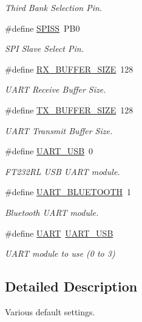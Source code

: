 \begin{DoxyCompactItemize}
\begin{DoxyCompactList}\small\item\em Third Bank Selection Pin. \end{DoxyCompactList}\item 
\#define \hyperlink{group__config_gab652052c0495e4b720b52cdcf83f535d}{S\-P\-I\-S\-S}~P\-B0
\begin{DoxyCompactList}\small\item\em S\-P\-I Slave Select Pin. \end{DoxyCompactList}\item 
\#define \hyperlink{group__config_ga739a2a1a0047c98ac1b18ecd25dac092}{R\-X\-\_\-\-B\-U\-F\-F\-E\-R\-\_\-\-S\-I\-Z\-E}~128
\begin{DoxyCompactList}\small\item\em U\-A\-R\-T Receive Buffer Size. \end{DoxyCompactList}\item 
\#define \hyperlink{group__config_ga9ab33647617098646990fe263600b650}{T\-X\-\_\-\-B\-U\-F\-F\-E\-R\-\_\-\-S\-I\-Z\-E}~128
\begin{DoxyCompactList}\small\item\em U\-A\-R\-T Transmit Buffer Size. \end{DoxyCompactList}\item 
\#define \hyperlink{group__config_ga9757131cd175465e6220de58b57f6b78}{U\-A\-R\-T\-\_\-\-U\-S\-B}~0
\begin{DoxyCompactList}\small\item\em F\-T232\-R\-L U\-S\-B U\-A\-R\-T module. \end{DoxyCompactList}\item 
\#define \hyperlink{group__config_ga2c948aa36e7c71b5e04623c1f560f1f1}{U\-A\-R\-T\-\_\-\-B\-L\-U\-E\-T\-O\-O\-T\-H}~1
\begin{DoxyCompactList}\small\item\em Bluetooth U\-A\-R\-T module. \end{DoxyCompactList}\item 
\#define \hyperlink{group__config_gaf7cb12b462b4594bd759d1b4e241ec4c}{U\-A\-R\-T}~\hyperlink{group__config_ga9757131cd175465e6220de58b57f6b78}{U\-A\-R\-T\-\_\-\-U\-S\-B}
\begin{DoxyCompactList}\small\item\em U\-A\-R\-T module to use (0 to 3) \end{DoxyCompactList}\end{DoxyCompactItemize}


\subsection{Detailed Description}
Various default settings. 

